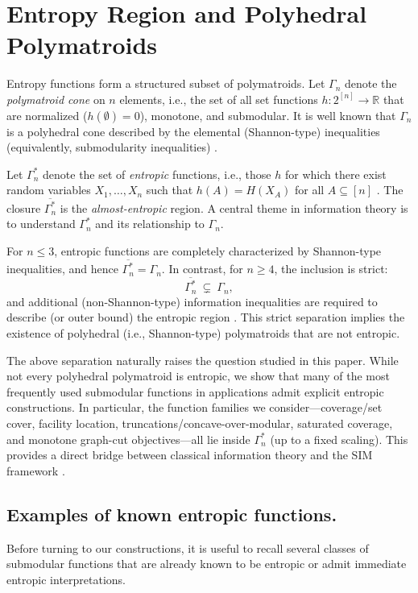 \documentclass[conference]{IEEEtran}
\theoremstyle{definition}
\theoremstyle{remark}
\begin{document}
\section{Entropy Region and Polyhedral Polymatroids}
\label{sec:entropy_polyhedral}

Entropy functions form a structured subset of polymatroids.
Let $\Gamma_n$ denote the \emph{polymatroid cone} on $n$ elements, i.e., the set of all set functions
$h:2^{[n]}\to\mathbb{R}$ that are normalized ($h(\emptyset)=0$), monotone, and submodular.
It is well known that $\Gamma_n$ is a polyhedral cone described by the elemental (Shannon-type) inequalities
(equivalently, submodularity inequalities) \cite{Yeung2008,Fujishige2005,Schrijver2003,iyer2015polyhedral}.

Let $\Gamma_n^\ast$ denote the set of \emph{entropic} functions, i.e., those $h$ for which there exist random variables
$X_1,\ldots,X_n$ such that $h(A)=H(X_A)$ for all $A\subseteq[n]$ \cite{Shannon1948,Yeung2008}.
The closure $\overline{\Gamma_n^\ast}$ is the \emph{almost-entropic} region.
A central theme in information theory is to understand $\Gamma_n^\ast$ and its relationship to $\Gamma_n$.

For $n\le 3$, entropic functions are completely characterized by Shannon-type inequalities, and hence
$\overline{\Gamma_n^\ast}=\Gamma_n$. In contrast, for $n\ge 4$, the inclusion is strict:
\[
\overline{\Gamma_n^\ast}\ \subsetneq\ \Gamma_n,
\]
and additional (non-Shannon-type) information inequalities are required to describe (or outer bound) the entropic region
\cite{ZhangYeung1997,ZhangYeung1998,DoughertyFreilingZeger2011}.
This strict separation implies the existence of polyhedral (i.e., Shannon-type) polymatroids that are not entropic.

The above separation naturally raises the question studied in this paper.
While not every polyhedral polymatroid is entropic, we show that many of the most frequently used submodular functions in
applications admit explicit entropic constructions.
In particular, the function families we consider---coverage/set cover, facility location, truncations/concave-over-modular,
saturated coverage, and monotone graph-cut objectives---all lie inside $\Gamma_n^\ast$ (up to a fixed scaling).
This provides a direct bridge between classical information theory and the SIM framework
\cite{iyer2021generalized,iyer2021submodular,asnani2021independence}.

\subsection{Examples of known entropic functions.}
Before turning to our constructions, it is useful to recall several classes of submodular functions that are
already known to be entropic or admit immediate entropic interpretations.
\end{document}
